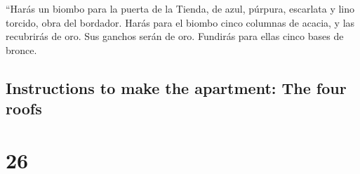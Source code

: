 \begin{paracol}{2}
 ``Harás un biombo para la puerta de la Tienda, de azul,
púrpura, escarlata y lino torcido, obra del bordador. 
Harás para el biombo cinco columnas de acacia, y las recubrirás de oro.
Sus ganchos serán de oro. Fundirás para ellas cinco bases de bronce.

\switchcolumn
\begin{otherlanguage}{english}

\hypertarget{instructions-to-make-the-apartment-the-four-roofs}{%
\subsection{Instructions to make the apartment: The four
roofs}\label{instructions-to-make-the-apartment-the-four-roofs}}

\hypertarget{section-51}{%
\section{26}\label{section-51}}


\end{otherlanguage}
\end{paracol}
